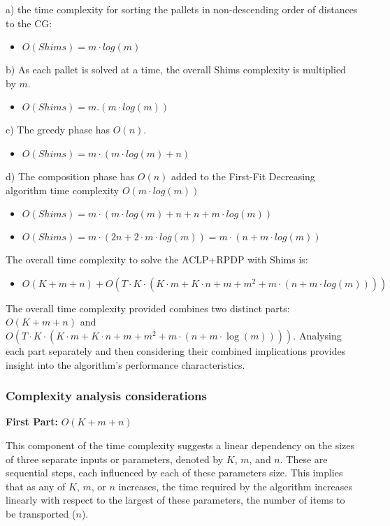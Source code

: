 \documentclass[preprint,authoryear]{elsarticle}
\begin{document}
{a) the time complexity for sorting the pallets in non-descending order of distances to the CG:
\begin{itemize}
	\item $O(Shims) = m \cdot log(m)$
\end{itemize}

b) As each pallet is solved at a time, the overall Shims complexity is multiplied by $m$.
\begin{itemize}
	\item $O(Shims) = m.(m \cdot log(m))$
\end{itemize}

c) The greedy phase has $O(n)$.
\begin{itemize}
	\item $O(Shims) = m \cdot (m \cdot log(m) + n)$
\end{itemize}

d) The composition phase has $O(n)$ added to the First-Fit Decreasing algorithm time complexity $O(m \cdot log(m))$
\begin{itemize}
	\item $O(Shims) = m \cdot (m \cdot log(m) + n + n + m \cdot log(m))$
	\item $O(Shims) = m \cdot (2n + 2 \cdot m \cdot log(m)) = m \cdot (n + m \cdot log(m))$
\end{itemize}

The overall time complexity to solve the ACLP+RPDP with Shims is:
\begin{itemize}
	\item $O(K+m+n) + O(T \cdot K \cdot (K \cdot m + K \cdot n + m + m^2 + m \cdot (n + m \cdot log(m))))$
\end{itemize}


The overall time complexity provided combines two distinct parts: $O(K+m+n)$ and $O(T \cdot K \cdot (K \cdot m + K \cdot n + m + m^2 + m \cdot (n + m \cdot \log(m))))$. Analysing each part separately and then considering their combined implications provides insight into the algorithm's performance characteristics.

\subsubsection{Complexity analysis considerations}

\textbf{First Part:} $O(K+m+n)$

This component of the time complexity suggests a linear dependency on the sizes of three separate inputs or parameters, denoted by $K$, $m$, and $n$.
These are sequential steps, each influenced by each of these parameters size. This implies that as any of $K$, $m$, or $n$ increases, the time required by the algorithm increases linearly with respect to the largest of these parameters, the number of items to be transported ($n$).

}
\end{document}
